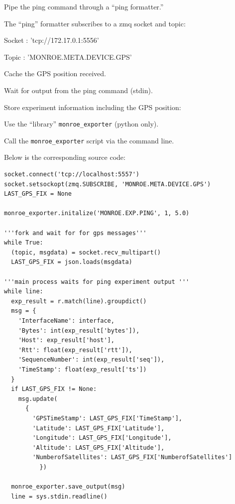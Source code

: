 \documentclass[a4paper,10pt]{article}
\newcommand{\VerbatimFont}{\footnotesize}
\newcommand{\identifier}[1]{{\texttt{\small{#1}}}}
\begin{document}
\begin{itemize*}
	\item Pipe the ping command through a ``ping formatter.''
	\item The ``ping'' formatter subscribes to a zmq socket and topic:
	\begin{itemize*}
		\item Socket : 'tcp://172.17.0.1:5556'
		\item Topic : 'MONROE.META.DEVICE.GPS' 
	\end{itemize*}
	\item Cache the GPS position received. 
	\item Wait for output from the ping command (stdin).
	\item Store experiment information including the GPS position:
	\begin{itemize*}
		\item Use the ``library'' \identifier{monroe\_exporter} (python only).
		\item Call the \identifier{monroe\_exporter} script via the command line.
	\end{itemize*}
\end{itemize*}

Below is the corresponding source code:
{\VerbatimFont
\begin{verbatim}
socket.connect('tcp://localhost:5557')
socket.setsockopt(zmq.SUBSCRIBE, 'MONROE.META.DEVICE.GPS')
LAST_GPS_FIX = None

monroe_exporter.initalize('MONROE.EXP.PING', 1, 5.0)

'''fork and wait for for gps messages'''
while True:
  (topic, msgdata) = socket.recv_multipart()
  LAST_GPS_FIX = json.loads(msgdata)

'''main process waits for ping experiment output '''
while line:
  exp_result = r.match(line).groupdict()
  msg = {
    'InterfaceName': interface,
    'Bytes': int(exp_result['bytes']),
    'Host': exp_result['host'],
    'Rtt': float(exp_result['rtt']),
    'SequenceNumber': int(exp_result['seq']),
    'TimeStamp': float(exp_result['ts'])
  }
  if LAST_GPS_FIX != None:
    msg.update(
      {
        'GPSTimeStamp': LAST_GPS_FIX['TimeStamp'],
        'Latitude': LAST_GPS_FIX['Latitude'],
        'Longitude': LAST_GPS_FIX['Longitude'],
        'Altitude': LAST_GPS_FIX['Altitude'],
        'NumberofSatellites': LAST_GPS_FIX['NumberofSatellites']
          })

  monroe_exporter.save_output(msg)
  line = sys.stdin.readline()
\end{verbatim}
}
 
\end{document}
